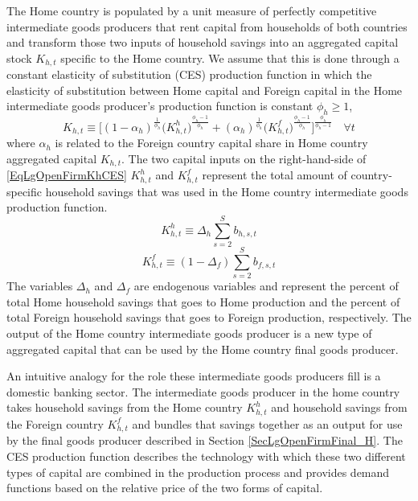     The Home country is populated by a unit measure of perfectly competitive intermediate goods producers that rent capital from households of both countries and transform those two inputs of household savings into an aggregated capital stock $K_{h,t}$ specific to the Home country. We assume that this is done through a constant elasticity of substitution (CES) production function in which the elasticity of substitution between Home capital and Foreign capital in the Home intermediate goods producer's production function is constant $\phi_h\geq 1$,
    \begin{equation}\label{EqLgOpenFirmKhCES}
      K_{h,t}\equiv \biggl[(1 - \alpha_h)^\frac{1}{\phi_h}\bigl(K^h_{h,t}\bigr)^\frac{\phi_h-1}{\phi_h} + (\alpha_h)^\frac{1}{\phi_h}\bigl(K^f_{h,t}\bigr)^\frac{\phi_h-1}{\phi_h}\biggr]^\frac{\phi_h}{\phi_h-1} \quad\forall t
    \end{equation}
    where $\alpha_h$ is related to the Foreign country capital share in Home country aggregated capital $K_{h,t}$. The two capital inputs on the right-hand-side of \eqref{EqLgOpenFirmKhCES} $K^h_{h,t}$ and $K^f_{h,t}$ represent the total amount of country-specific household savings that was used in the Home country intermediate goods production function.
    \begin{equation}\label{EqLgOpenFirmKhh}
      K^h_{h,t} \equiv \Delta_h \sum_{s=2}^S b_{h,s,t}
    \end{equation}
    \begin{equation}\label{EqLgOpenFirmKhf}
      K^f_{h,t} \equiv (1 - \Delta_f)\sum_{s=2}^S b_{f,s,t}
    \end{equation}
    The variables $\Delta_h$ and $\Delta_f$ are endogenous variables and represent the percent of total Home household savings that goes to Home production and the percent of total Foreign household savings that goes to Foreign production, respectively. The output of the Home country intermediate goods producer is a new type of aggregated capital that can be used by the Home country final goods producer.

    An intuitive analogy for the role these intermediate goods producers fill is a domestic banking sector. The intermediate goods producer in the home country takes household savings from the Home country $K^h_{h,t}$ and household savings from the Foreign country $K^f_{h,t}$ and bundles that savings together as an output for use by the final goods producer described in Section \ref{SecLgOpenFirmFinal_H}. The CES production function describes the technology with which these two different types of capital are combined in the production process and provides demand functions based on the relative price of the two forms of capital.

